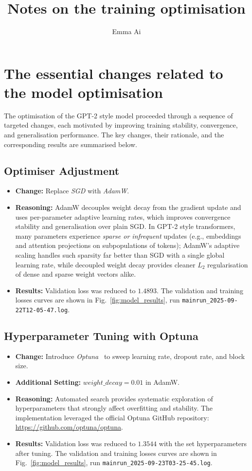 \documentclass[12pt]{article}
\title{Notes on the training optimisation}
\author{Emma Ai}
\begin{document}
\maketitle
\section{The essential changes related to the model optimisation}

The optimisation of the GPT-2 style model proceeded through a sequence of targeted changes, each motivated by improving training stability, convergence, and generalisation performance. The key changes, their rationale, and the corresponding results are summarised below.


\subsection{Optimiser Adjustment}
\begin{itemize}
  \item \textbf{Change:} Replace \textit{SGD} with \textit{AdamW}.
  \item \textbf{Reasoning:} AdamW decouples weight decay from the gradient update and uses per-parameter adaptive learning rates, which improves convergence stability and generalisation over plain SGD. In GPT-2 style transformers, many parameters experience \emph{sparse or infrequent} updates (e.g., embeddings and attention projections on subpopulations of tokens); AdamW’s adaptive scaling handles such sparsity far better than SGD with a single global learning rate, while decoupled weight decay provides cleaner $L_2$ regularisation of dense and sparse weight vectors alike.
  \item \textbf{Results:} Validation loss was reduced to $1.4893$. The validation and training losses curves are shown in Fig.~\ref{fig:model_results}, run \texttt{mainrun\_2025-09-22T12-05-47.log}.
\end{itemize}


\subsection{Hyperparameter Tuning with Optuna}
\begin{itemize}
  \item \textbf{Change:} Introduce \textit{Optuna}~\cite{optuna} to sweep learning rate, dropout rate, and block size.  
  \item \textbf{Additional Setting:} $weight\_decay=0.01$ in AdamW.
  \item \textbf{Reasoning:} Automated search provides systematic exploration of hyperparameters that strongly affect overfitting and stability. The implementation leveraged the official Optuna GitHub repository: \url{https://github.com/optuna/optuna}.
  \item \textbf{Results:} Validation loss was reduced to $1.3544$ with the set hyperparameters after tuning. The validation and training losses curves are shown in Fig.~\ref{fig:model_results},  run \texttt{mainrun\_2025-09-23T03-25-45.log}.
\end{itemize}
\end{document}
